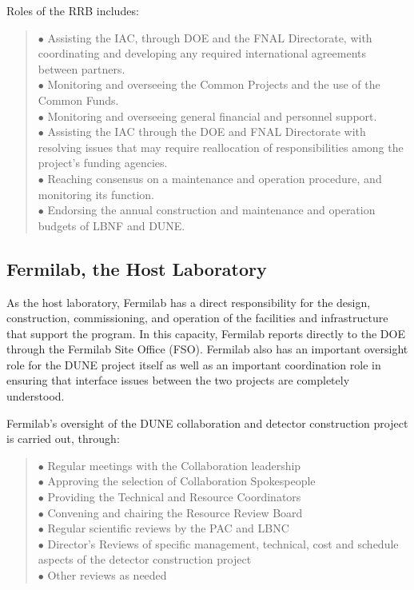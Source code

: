 Roles of the RRB includes: 
\begin{quote}
$\bullet$ Assisting the IAC, through DOE and the FNAL Directorate,
with coordinating and developing any required international
agreements between partners.\\
$\bullet$ Monitoring and overseeing the Common Projects and the
use of the Common Funds.\\
$\bullet$ Monitoring and overseeing general financial and personnel support.\\
$\bullet$ Assisting the IAC through the DOE and FNAL Directorate
with resolving issues that may require reallocation of responsibilities
among the project’s funding agencies.\\
$\bullet$ Reaching consensus on a maintenance and operation procedure,
and monitoring its function.\\
$\bullet$ Endorsing the annual construction and maintenance and operation
budgets of LBNF and DUNE.\\
\end{quote}

\subsection{Fermilab, the Host Laboratory}

As the host laboratory, Fermilab has a direct responsibility for the design,
construction, commissioning, and operation of the facilities and
infrastructure that support the program.  In this capacity, Fermilab reports
directly to the DOE through the Fermilab Site Office (FSO).
Fermilab also has an important oversight role for the DUNE project
itself as well as an important coordination role in ensuring that
interface issues between the two projects are completely understood.

Fermilab's oversight of the DUNE collaboration and detector
construction project is carried out, through:
\begin{quote}
$\bullet$ Regular meetings with the Collaboration leadership\\
$\bullet$ Approving the selection of Collaboration Spokespeople\\
$\bullet$ Providing the Technical and Resource Coordinators\\
$\bullet$ Convening and chairing the Resource Review Board\\
$\bullet$ Regular scientific reviews by the PAC and LBNC\\
$\bullet$ Director’s Reviews of specific management, technical,
cost and schedule aspects of the detector construction project\\
$\bullet$ Other reviews as needed
\end{quote}

